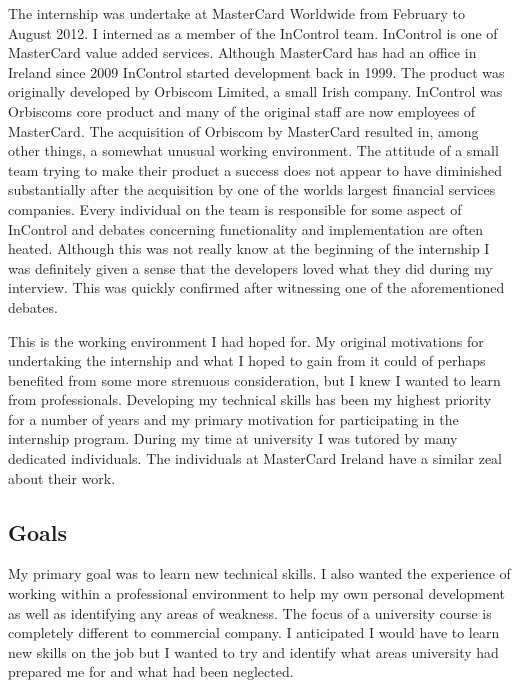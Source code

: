 \documentclass[a4paper, 11pt, titlepage]{article}
\begin{document}
The internship was undertake at MasterCard Worldwide from February to August 2012. I interned as a member of the InControl team. InControl is one of MasterCard value added services. Although MasterCard has had an office in Ireland since 2009 InControl started development back in 1999. The product was originally developed by Orbiscom Limited, a small Irish company. InControl was Orbiscoms core product and many of the original staff are now employees of MasterCard. The acquisition of Orbiscom by MasterCard resulted in, among other things, a somewhat unusual working environment. The attitude of a small team trying to make their product a success does not appear to have diminished substantially after the acquisition by one of the worlds largest financial services companies. Every individual on the team is responsible for some aspect of InControl and debates concerning functionality and implementation are often heated. Although this was not really know at the beginning of the internship I was definitely given a sense that the developers loved what they did during my interview. This was quickly confirmed after witnessing one of the aforementioned debates. 

This is the working environment I had hoped for. My original motivations for undertaking the internship and what I hoped to gain from it could of perhaps benefited from some more strenuous consideration, but I knew I wanted to learn from professionals. Developing my technical skills has been my highest priority for a number of years and my primary motivation for participating in the internship program. During my time at university I was tutored by many dedicated individuals. The individuals at MasterCard Ireland have a similar zeal about their work. 
 
\subsection{Goals} 
 
My primary goal was to learn new technical skills. I also wanted the experience of working within a professional environment to help my own personal development as well as identifying any areas of weakness. The focus of a university course is completely different to commercial company. I anticipated I would have to learn new skills on the job but I wanted to try and identify what areas university had prepared me for and what had been neglected. 
\end{document}
